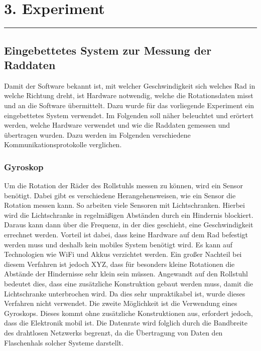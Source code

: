 \hypertarget{experiment}{%
\section{3. Experiment}\label{experiment}}

\begin{center}\rule{0.5\linewidth}{0.5pt}\end{center}

\hypertarget{eingebettetes-system-zur-messung-der-raddaten}{%
\subsection{Eingebettetes System zur Messung der
Raddaten}\label{eingebettetes-system-zur-messung-der-raddaten}}

Damit der Software bekannt ist, mit welcher Geschwindigkeit sich welches
Rad in welche Richtung dreht, ist Hardware notwendig, welche die
Rotationsdaten misst und an die Software übermittelt. Dazu wurde für das
vorliegende Experiment ein eingebettetes System verwendet. Im Folgenden
soll näher beleuchtet und erörtert werden, welche Hardware verwendet und
wie die Raddaten gemessen und übertragen wurden. Dazu werden im
Folgenden verschiedene Kommunikationsprotokolle verglichen.

\hypertarget{gyroskop}{%
\subsubsection{Gyroskop}\label{gyroskop}}

Um die Rotation der Räder des Rollstuhls messen zu können, wird ein
Sensor benötigt. Dabei gibt es verschiedene Herangehensweisen, wie ein
Sensor die Rotation messen kann. So arbeiten viele Sensoren mit
Lichtschranken. Hierbei wird die Lichtschranke in regelmäßigen Abständen
durch ein Hindernis blockiert. Daraus kann dann über die Frequenz, in
der dies geschieht, eine Geschwindigkeit errechnet werden. Vorteil ist
dabei, dass keine Hardware auf dem Rad befestigt werden muss und deshalb
kein mobiles System benötigt wird. Es kann auf Technologien wie WiFi und
Akkus verzichtet werden. Ein großer Nachteil bei diesem Verfahren ist
jedoch XYZ, dass für besonders kleine Rotationen die Abstände der
Hindernisse sehr klein sein müssen. Angewandt auf den Rollstuhl bedeutet
dies, dass eine zusätzliche Konstruktion gebaut werden muss, damit die
Lichtschranke unterbrochen wird. Da dies sehr unpraktikabel ist, wurde
dieses Verfahren nicht verwendet. Die zweite Möglichkeit ist die
Verwendung eines Gyroskops. Dieses kommt ohne zusätzliche Konstruktionen
aus, erfordert jedoch, dass die Elektronik mobil ist. Die Datenrate wird
folglich durch die Bandbreite des drahtlosen Netzwerks begrenzt, da die
Übertragung von Daten den Flaschenhals solcher Systeme darstellt.

